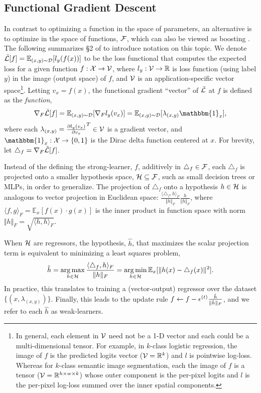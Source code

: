 \subsection{Functional Gradient Descent}
\label{sec:fgrad}
In contrast to optimizing a function in the space of parameters,
an alternative is to optimize in the space of functions, ${\mathcal{F}}$, which
can also be viewed as boosting \citep{mason2000, friedman2001}.
The following summarizes \S2 of \citet{grubbthesis} to introduce notation on this topic.
We denote $\bar{{\mathcal{L}}}[f] = \mathbb{E}_{(x,y) \sim {\mathcal{D}}}[l_{y}(f(x))]$ to be the loss functional
that computes the expected loss for a given function $f: {\mathcal{X}} \to {\mathcal{V}}$,
where $l_y: {\mathcal{V}} \to {\mathbb{R}}$ is loss function (using label $y$) in the image (output space) of $f$,
and ${\mathcal{V}}$ is an application-specific vector
space\footnote{In general, each element in ${\mathcal{V}}$ need not be a 1-D vector and each could
be a multi-dimensional tensor. 
For example, in $k$-class logistic regression, the image of $f$ is the predicted logits vector
(${\mathcal{V}} = {\mathbb{R}}^k$) and $l$ is pointwise log-loss.
Whereas for $k$-class semantic image segmentation, each the image of $f$ is a tensor
(${\mathcal{V}} = {\mathbb{R}}^{h \times w \times k}$) whose outer component is the per-pixel logits 
and $l$ is the per-pixel log-loss summed over the inner spatial components.}.
Letting $v_x = f(x)$, the functional gradient ``vector'' of $\bar{{\mathcal{L}}}$ at $f$ is defined as the
\emph{function},
%
\begin{equation*}
\nabla_F \bar{\gL}[f] = \E_{(x,y) \sim \gD} [\nabla_F l_y(v_x)] = \E_{(x,y) \sim \gD} [ \lambda_{(x,y)} \mathbbm{1}_x],
\end{equation*}
%
where each $\lambda_{(x,y)} = \frac{\partial l_y(v_x)}{\partial v_x}^T \in {\mathcal{V}}$
is a gradient vector, and $\mathbbm{1}_x: \gX \to \{0, 1\}$ is the Dirac delta function centered at $x$.
For brevity, let $\triangle_f = \nabla_F \tilde{{\mathcal{L}}}[f]$.

Instead of the defining the strong-learner, $f$, additively in $\triangle_f \in {\mathcal{F}}$,
each $\triangle_f$ is projected onto a smaller hypothesis space, ${\mathcal{H}} \subseteq {\mathcal{F}}$,
such as small decision trees or MLPs, in order to generalize.
The projection of $\triangle_f$ onto a hypothesis $h \in {\mathcal{H}}$ is analogous to vector projection in Euclidean space:
$\frac{\langle \triangle_f, h \rangle_F}{\Vert h \Vert_F}\frac{h}{\Vert h \Vert_F}$,
where $\langle f,g \rangle_F = \mathbb{E}_x[f(x) \cdot g(x)]$ is the inner product in function
space with norm $\Vert h \Vert_F = \sqrt{\langle h,h \rangle_F}$.

When ${\mathcal{H}}$ are regressors, the hypothesis, $\hat{h}$, that maximizes the scalar projection term is
equivalent \citep{friedman2001} to minimizing a least squares problem,
%
\begin{equation}
\label{eq:scalarproj}
\hat{h} = \operatorname*{arg\,max}_{h \in {\mathcal{H}}} \frac{\langle \triangle_f, h \rangle_F}{\Vert h \Vert_F}
= \operatorname*{arg\,min}_{h \in {\mathcal{H}}} \mathbb{E}_{x} [ \Vert h(x) -\triangle_f(x) \Vert^2 ].
\end{equation}
%
In practice, this translates to training a (vector-output) regressor
over the dataset $\{(x,\lambda_{(x,y)})\}$.
Finally, this leads to the update rule
$f \leftarrow f - {\epsilon}^{(t)} \frac{\hat{h}}{\Vert \hat{h} \Vert_F}$,
and we refer to each $\hat{h}$ as weak-learners.

